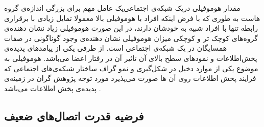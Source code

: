 \begin {persian}
\indent
مقدار هوموفیلی در‌یک شبکه‌ی اجتماعی‌یک عامل مهم برای بزرگی اندازه‌ی گروه ‌‌هاست \cite{watts_six_2004} به طوری که با فرض اینکه افراد با هوموفیلی بالا معمولا تمایل زیادی با برقراری رابطه تنها با افراد شبیه به خودشان دارند، در این صورت هوموفیلی زیاد نشان دهنده‌ی گروه‌های کوچک تر و کوچکی میزان هوموفیلی نشان دهنده‌ی وجود گوناگونی در صفات همسایگان در ‌یک شبکه‌ی اجتماعی است. از طرفی‌ یکی از پیامد‌‌های پدیده‌ی پخش‌اطلاعات و نمود‌های سطح بالای آن تاثیر آن در رفتار اعضا می‌باشد. هوموفیلی به موضوع‌ یکی از موارد دخیل در شکل‌گیری و نمو گراف ساختار شبکه‌ی‌های اجتماعی که فرایند پخش اطلاعات روی آن ‌‌ها صورت می‌پذیرد مورد توجه پژوهش گران در زمینه‌ی پدیده‌ی پخش اطلاعات می‌باشد \cite{weng_role_2013}. 

\end {persian}

\subsection{فرضیه قدرت اتصال‌های ضعیف}
